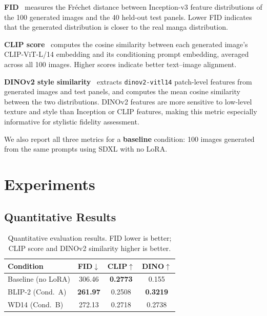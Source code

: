 \documentclass[10pt,twocolumn,letterpaper]{article}
\begin{document}
\textbf{FID}~\cite{heusel2017fid} measures the Fr\'{e}chet distance between Inception-v3 feature distributions of the 100 generated images and the 40 held-out test panels.
Lower FID indicates that the generated distribution is closer to the real manga distribution.

\textbf{CLIP score}~\cite{radford2021clip} computes the cosine similarity between each generated image's CLIP-ViT-L/14 embedding and its conditioning prompt embedding, averaged across all 100 images.
Higher scores indicate better text–image alignment.

\textbf{DINOv2 style similarity}~\cite{oquab2023dinov2} extracts \texttt{dinov2-vitl14} patch-level features from generated images and test panels, and computes the mean cosine similarity between the two distributions.
DINOv2 features are more sensitive to low-level texture and style than Inception or CLIP features, making this metric especially informative for stylistic fidelity assessment.

We also report all three metrics for a \textbf{baseline} condition: 100 images generated from the same prompts using SDXL with no LoRA.

\section{Experiments}

\subsection{Quantitative Results}

\begin{table}[h]
\centering
\caption{Quantitative evaluation results. FID lower is better; CLIP score and DINOv2 similarity higher is better.}
\label{tab:quant}
\begin{tabular}{lccc}
\toprule
\textbf{Condition} & \textbf{FID}$\downarrow$ & \textbf{CLIP}$\uparrow$ & \textbf{DINO}$\uparrow$ \\
\midrule
Baseline (no LoRA) & 306.46 & \textbf{0.2773} & 0.155 \\
BLIP-2 (Cond.\ A)  & \textbf{261.97} & 0.2508 & \textbf{0.3219} \\
WD14   (Cond.\ B)  & 272.13 & 0.2718 & 0.2738 \\
\bottomrule
\end{tabular}
\end{table}
\end{document}
